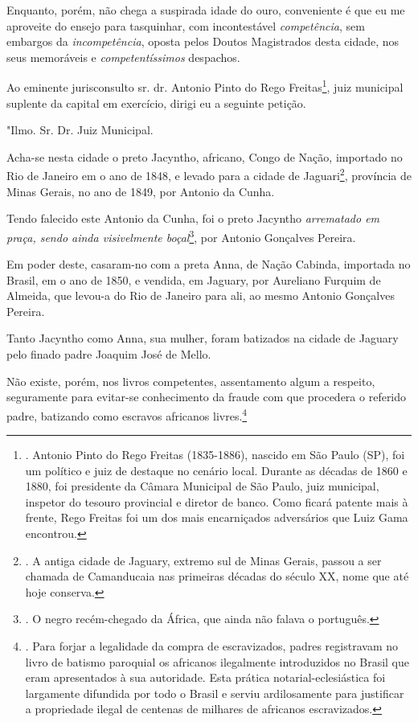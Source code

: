 Enquanto, porém, não chega a suspirada idade do ouro, conveniente é que
eu me aproveite do ensejo para tasquinhar, com incontestável
\emph{competência}, sem embargos da \emph{incompetência}, oposta pelos
Doutos Magistrados desta cidade, nos seus memoráveis e
\emph{competentíssimos} despachos.

Ao eminente jurisconsulto sr. dr. Antonio Pinto do Rego
Freitas\footnote{. Antonio Pinto do Rego Freitas (1835-1886), nascido em
  São Paulo (SP), foi um político e juiz de destaque no cenário local.
  Durante as décadas de 1860 e 1880, foi presidente da Câmara Municipal
  de São Paulo, juiz municipal, inspetor do tesouro provincial e diretor
  de banco. Como ficará patente mais à frente, Rego Freitas foi um dos
  mais encarniçados adversários que Luiz Gama encontrou.}, juiz
municipal suplente da capital em exercício, dirigi eu a seguinte
petição.

"Ilmo. Sr. Dr. Juiz Municipal.

Acha-se nesta cidade o preto Jacyntho, africano, Congo de Nação,
importado no Rio de Janeiro em o ano de 1848, e levado para a cidade de
Jaguari\footnote{. A antiga cidade de Jaguary, extremo sul de Minas
  Gerais, passou a ser chamada de Camanducaia nas primeiras décadas do
  século XX, nome que até hoje conserva.}, província de Minas Gerais, no
ano de 1849, por Antonio da Cunha.

Tendo falecido este Antonio da Cunha, foi o preto Jacyntho
\emph{arrematado em praça, sendo ainda visivelmente boçal}\footnote{. O
  negro recém-chegado da África, que ainda não falava o português.}, por
Antonio Gonçalves Pereira.

Em poder deste, casaram-no com a preta Anna, de Nação Cabinda, importada
no Brasil, em o ano de 1850, e vendida, em Jaguary, por Aureliano
Furquim de Almeida, que levou-a do Rio de Janeiro para ali, ao mesmo
Antonio Gonçalves Pereira.

Tanto Jacyntho como Anna, sua mulher, foram batizados na cidade de
Jaguary pelo finado padre Joaquim José de Mello.

Não existe, porém, nos livros competentes, assentamento algum a
respeito, seguramente para evitar-se conhecimento da fraude com que
procedera o referido padre, batizando como escravos africanos
livres.\footnote{. Para forjar a legalidade da compra de escravizados,
  padres registravam no livro de batismo paroquial os africanos
  ilegalmente introduzidos no Brasil que eram apresentados à sua
  autoridade. Esta prática notarial-eclesiástica foi largamente
  difundida por todo o Brasil e serviu ardilosamente para justificar a
  propriedade ilegal de centenas de milhares de africanos escravizados.}

